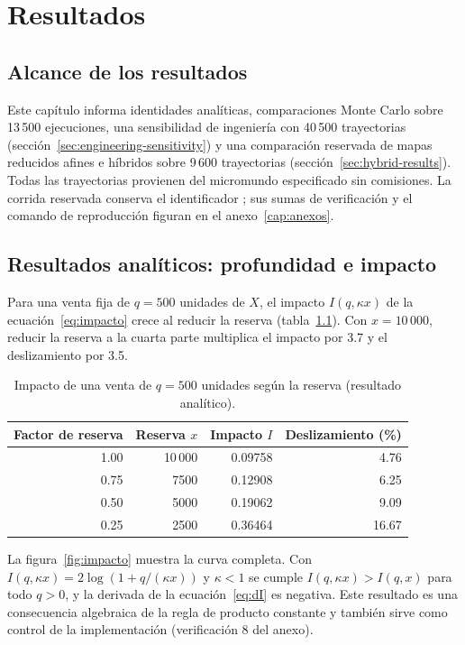 \chapter{Resultados}
\label{cap:resultados}

\section{Alcance de los resultados}

Este capítulo informa identidades analíticas, comparaciones Monte Carlo sobre 13\,500 ejecuciones, una sensibilidad de ingeniería con 40\,500 trayectorias (sección~\ref{sec:engineering-sensitivity}) y una comparación reservada de mapas reducidos afines e híbridos sobre 9\,600 trayectorias (sección~\ref{sec:hybrid-results}). Todas las trayectorias provienen del micromundo especificado sin comisiones. La corrida reservada conserva el identificador \code{\RunID}; sus sumas de verificación y el comando de reproducción figuran en el anexo~\ref{cap:anexos}.

\section{Resultados analíticos: profundidad e impacto}
\label{sec:res-analitico}

Para una venta fija de $q=500$ unidades de $X$, el impacto $I(q,\kappa x)$ de la ecuación~\eqref{eq:impacto} crece al reducir la reserva (tabla~\ref{tab:impacto}). Con $x=10\,000$, reducir la reserva a la cuarta parte multiplica el impacto por 3.7 y el deslizamiento por 3.5.

\begin{table}[htbp]
\centering
\caption{Impacto de una venta de $q=500$ unidades según la reserva (resultado analítico).}
\label{tab:impacto}
\small
\begin{tabular}{@{}rrrr@{}}
\toprule
Factor de reserva & Reserva $x$ & Impacto $I$ & Deslizamiento (\%) \\
\midrule
1.00 & 10\,000 & 0.09758 & 4.76 \\
0.75 & 7500 & 0.12908 & 6.25 \\
0.50 & 5000 & 0.19062 & 9.09 \\
0.25 & 2500 & 0.36464 & 16.67 \\
\bottomrule
\end{tabular}
\end{table}

La figura~\ref{fig:impacto} muestra la curva completa. Con $I(q,\kappa x)=2\log(1+q/(\kappa x))$ y $\kappa<1$ se cumple $I(q,\kappa x)>I(q,x)$ para todo $q>0$, y la derivada de la ecuación~\eqref{eq:dI} es negativa. Este resultado es una consecuencia algebraica de la regla de producto constante y también sirve como control de la implementación (verificación 8 del anexo).

